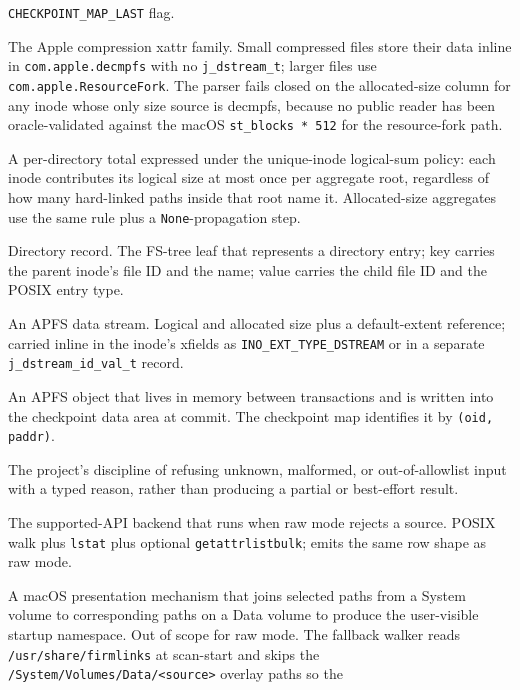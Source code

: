 \begin{description}
    \texttt{CHECKPOINT\_MAP\_LAST} flag.
  \item[decmpfs.] The Apple compression xattr family. Small
    compressed files store their data inline in
    \texttt{com.apple.decmpfs} with no \texttt{j\_dstream\_t};
    larger files use \texttt{com.apple.ResourceFork}. The parser
    fails closed on the allocated-size column for any inode whose
    only size source is decmpfs, because no public reader has been
    oracle-validated against the macOS \texttt{st\_blocks * 512}
    for the resource-fork path.
  \item[Directory aggregate.] A per-directory total expressed
    under the unique-inode logical-sum policy: each inode
    contributes its logical size at most once per aggregate root,
    regardless of how many hard-linked paths inside that root
    name it. Allocated-size aggregates use the same rule plus a
    \texttt{None}-propagation step.
  \item[\texttt{DIR\_REC}.] Directory record. The FS-tree leaf
    that represents a directory entry; key carries the parent
    inode's file ID and the name; value carries the child file ID
    and the POSIX entry type.
  \item[Dstream.] An APFS data stream. Logical and allocated size
    plus a default-extent reference; carried inline in the inode's
    xfields as \texttt{INO\_EXT\_TYPE\_DSTREAM} or in a separate
    \texttt{j\_dstream\_id\_val\_t} record.
  \item[Ephemeral object.] An APFS object that lives in memory
    between transactions and is written into the checkpoint data
    area at commit. The checkpoint map identifies it by
    \texttt{(oid, paddr)}.
  \item[Fail closed.] The project's discipline of refusing
    unknown, malformed, or out-of-allowlist input with a typed
    reason, rather than producing a partial or best-effort
    result.
  \item[Fallback path.] The supported-API backend that runs when
    raw mode rejects a source. POSIX walk plus \texttt{lstat}
    plus optional \texttt{getattrlistbulk}; emits the same row
    shape as raw mode.
  \item[Firmlink.] A macOS presentation mechanism that joins
    selected paths from a System volume to corresponding paths on
    a Data volume to produce the user-visible startup namespace.
    Out of scope for raw mode. The fallback walker reads
    \texttt{/usr/share/firmlinks} at scan-start and skips the
    \texttt{/System/Volumes/Data/<source>} overlay paths so the

\end{description}
